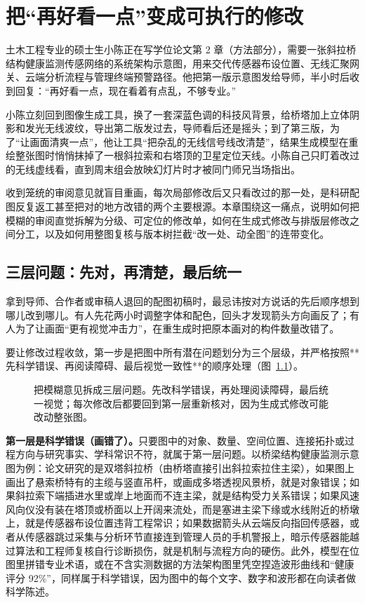 \chapter{把“再好看一点”变成可执行的修改}
\usetikzlibrary{decorations.pathmorphing}

土木工程专业的硕士生小陈正在写学位论文第 2 章（方法部分），需要一张斜拉桥结构健康监测传感网络的系统架构示意图，用来交代传感器布设位置、无线汇聚网关、云端分析流程与管理终端预警路径。他把第一版示意图发给导师，半小时后收到回复：“再好看一点，现在看着有点乱，不够专业。”

小陈立刻回到图像生成工具，换了一套深蓝色调的科技风背景，给桥塔加上立体阴影和发光无线波纹，导出第二版发过去，导师看后还是摇头；到了第三版，为了“让画面清爽一点”，他让工具“把杂乱的无线信号线改清楚”，结果生成模型在重绘整张图时悄悄抹掉了一根斜拉索和右塔顶的卫星定位天线。小陈自己只盯着改过的无线虚线看，直到周末组会放映幻灯片时才被同门师兄当场指出。

收到笼统的审阅意见就盲目重画，每次局部修改后又只看改过的那一处，是科研配图反复返工甚至把对的地方改错的两个主要根源。本章围绕这一痛点，说明如何把模糊的审阅直觉拆解为分级、可定位的修改单，如何在生成式修改与排版层修改之间分工，以及如何用整图复核与版本树拦截“改一处、动全图”的连带变化。

\section{三层问题：先对，再清楚，最后统一}

拿到导师、合作者或审稿人退回的配图初稿时，最忌讳按对方说话的先后顺序想到哪儿改到哪儿。有人先花两小时调整字体和配色，回头才发现箭头方向画反了；有人为了让画面“更有视觉冲击力”，在重生成时把原本画对的构件数量改错了。

要让修改过程收敛，第一步是把图中所有潜在问题划分为三个层级，并严格按照**先科学错误、再阅读障碍、最后视觉一致性**的顺序处理（图~\ref{fig:ch11-01}）。

\begin{figure}[htbp]\centering
\resizebox{\linewidth}{!}{}
\caption{把模糊意见拆成三层问题。先改科学错误，再处理阅读障碍，最后统一视觉；每次修改后都要回到第一层重新核对，因为生成式修改可能改动整张图。}\label{fig:ch11-01}
\end{figure}

\textbf{第一层是科学错误（画错了）。}只要图中的对象、数量、空间位置、连接拓扑或过程方向与研究事实、学科常识不符，就属于第一层问题。以桥梁结构健康监测示意图为例：论文研究的是双塔斜拉桥（由桥塔直接引出斜拉索拉住主梁），如果图上画出了悬索桥特有的主缆与竖直吊杆，或画成多塔透视风景桥，就是对象错误；如果斜拉索下端插进水里或岸上地面而不连主梁，就是结构受力关系错误；如果风速风向仪没有装在塔顶或桥面以上开阔来流处，而是塞进主梁下缘或水线附近的桥墩上，就是传感器布设位置违背工程常识；如果数据箭头从云端反向指回传感器，或者从传感器跳过采集与分析环节直接连到管理人员的手机警报上，暗示传感器能越过算法和工程师复核自行诊断损伤，就是机制与流程方向的硬伤。此外，模型在位图里拼错专业术语，或在不含实测数据的方法架构图里凭空捏造波形曲线和“健康评分 92\%”，同样属于科学错误，因为图中的每个文字、数字和波形都在向读者做科学陈述。

